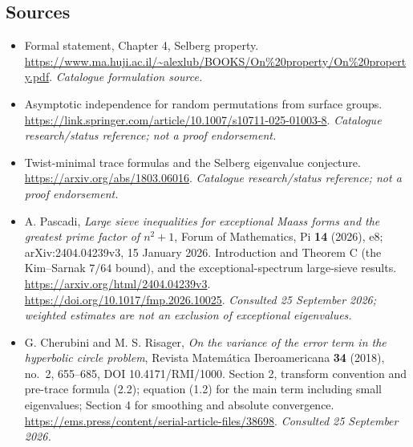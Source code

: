 \documentclass[11pt]{article}
\begin{document}
\subsection{Sources}
\begin{itemize}\raggedright
\item[\textnormal{[S1]}]\hypertarget{source:101:1}{} Formal statement, Chapter 4, Selberg property.
\url{https://www.ma.huji.ac.il/~alexlub/BOOKS/On%20property/On%20property.pdf}.
{\small\textit{Catalogue formulation source.}}
\item[\textnormal{[S2]}]\hypertarget{source:101:2}{} Asymptotic independence for random permutations from surface groups.
\url{https://link.springer.com/article/10.1007/s10711-025-01003-8}.
{\small\textit{Catalogue research/status reference; not a proof endorsement.}}
\item[\textnormal{[S3]}]\hypertarget{source:101:3}{} Twist-minimal trace formulas and the Selberg eigenvalue conjecture.
\url{https://arxiv.org/abs/1803.06016}.
{\small\textit{Catalogue research/status reference; not a proof endorsement.}}
\item[\textnormal{[E1]}]\hypertarget{extra:101:1}{}
A. Pascadi, \emph{Large sieve inequalities for exceptional Maass forms and
the greatest prime factor of $n^2+1$}, Forum of Mathematics, Pi \textbf{14}
(2026), e8; arXiv:2404.04239v3, 15 January 2026. Introduction and Theorem C
(the Kim--Sarnak $7/64$ bound), and the exceptional-spectrum large-sieve
results. \url{https://arxiv.org/html/2404.04239v3}.
\url{https://doi.org/10.1017/fmp.2026.10025}.
{\small\textit{Consulted 25 September 2026; weighted estimates are not an
exclusion of exceptional eigenvalues.}}
\item[\textnormal{[E2]}]\hypertarget{extra:101:2}{}
G. Cherubini and M. S. Risager, \emph{On the variance of the error term in
the hyperbolic circle problem}, Revista Matem\'atica Iberoamericana
\textbf{34} (2018), no.~2, 655--685, DOI 10.4171/RMI/1000.
Section 2, transform convention and pre-trace formula (2.2); equation (1.2)
for the main term including small eigenvalues; Section 4 for smoothing and
absolute convergence.
\url{https://ems.press/content/serial-article-files/38698}.
{\small\textit{Consulted 25 September 2026.}}
\end{itemize}
\end{document}
